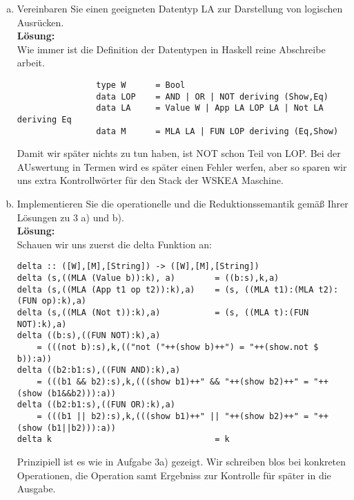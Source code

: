 \documentclass[11pt,a4paper,ngerman]{article}
\begin{document}

\begin{enumerate}[a)]
    \item   Vereinbaren Sie einen geeigneten Datentyp LA zur Darstellung 
            von logischen Ausrücken.\\
            \textbf{Lösung:}\\
            
            Wie immer ist die Definition der Datentypen in Haskell reine Abschreibe arbeit.
            \begin{lstlisting}
                type W      = Bool
                data LOP    = AND | OR | NOT deriving (Show,Eq)
                data LA     = Value W | App LA LOP LA | Not LA  deriving Eq
                data M      = MLA LA | FUN LOP deriving (Eq,Show)
            \end{lstlisting}
            Damit wir später nichts zu tun haben, ist NOT schon Teil von LOP. Bei der
            AUswertung in Termen wird es später einen Fehler werfen, aber so
            sparen wir uns extra Kontrollwörter für den Stack der WSKEA Maschine.


    \item   Implementieren Sie die operationelle und die Reduktionssemantik
            gemäß Ihrer Lösungen zu 3 a) und b).\\
            \textbf{Lösung:}\\
           
            Schauen wir uns zuerst die delta Funktion an:
            \begin{lstlisting}
delta :: ([W],[M],[String]) -> ([W],[M],[String])
delta (s,((MLA (Value b)):k), a)        = ((b:s),k,a)
delta (s,((MLA (App t1 op t2)):k),a)    = (s, ((MLA t1):(MLA t2):(FUN op):k),a)
delta (s,((MLA (Not t)):k),a)           = (s, ((MLA t):(FUN NOT):k),a)
delta ((b:s),((FUN NOT):k),a)       
    = (((not b):s),k,(("not ("++(show b)++") = "++(show.not $ b)):a))
delta ((b2:b1:s),((FUN AND):k),a)   
    = (((b1 && b2):s),k,(((show b1)++" && "++(show b2)++" = "++(show (b1&&b2))):a))
delta ((b2:b1:s),((FUN OR):k),a)   
    = (((b1 || b2):s),k,(((show b1)++" || "++(show b2)++" = "++(show (b1||b2))):a))
delta k                                 = k
            \end{lstlisting} 
            Prinzipiell ist es wie in Aufgabe 3a) gezeigt. Wir schreiben blos bei
            konkreten Operationen, die Operation samt Ergebniss zur Kontrolle
            für später in die Ausgabe.\\


\end{enumerate}
\end{document}

